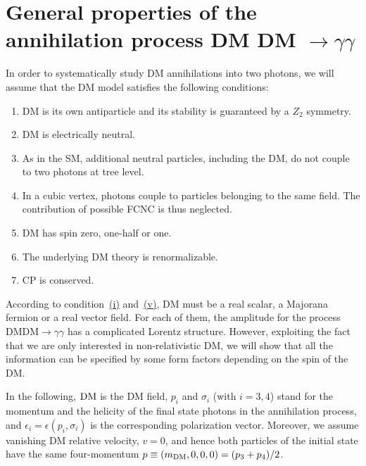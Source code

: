 \section{General properties of the annihilation process DM DM $\to \gamma \gamma$}
\label{sec:cond}
In order to systematically study DM annihilations into two photons, we will assume that the DM model satisfies the following conditions: 
%
\begin{enumerate}
\item[\label{condition:i}(i)] DM is its own antiparticle and its stability is guaranteed by a $Z_2$ symmetry. 
\item[\label{condition:ii}(ii)] DM is electrically neutral.
\item[\label{condition:iii}(iii)] As in the SM, additional neutral particles, including the DM, do not couple to two photons at tree level. 
\item[\label{condition:iv}(iv)] In a cubic vertex, photons couple to particles belonging to the same field.  The contribution of possible FCNC is thus neglected. 
\item[ \label{condition:v}(v)] DM has spin zero, one-half or one. 
\item[ \label{condition:vi}(vi)]  The underlying DM theory is renormalizable.
\item[ \label{condition:vii}(vii)]  CP is conserved. 
\end{enumerate}

According to condition~\hyperref[condition:v]{(i)} and~\hyperref[condition:v]{(v)},  DM must be a real scalar, a Majorana fermion or a real vector field. %
For each of them, the  amplitude for the process $\text{DM}\text{DM}\to\gamma\gamma$  has  a complicated Lorentz structure. However, exploiting the fact that  we are only interested in non-relativistic DM, %
we will show that all the information can be specified by some form factors depending on the spin of the DM.

In the following, $\text{DM}$ is the DM field, $p_i$ and $\sigma_i$  (with $i =3, 4$) stand for the momentum and the helicity of the final state photons in the annihilation process, and $\epsilon_i=\epsilon(p_i,\sigma_i)$ is the corresponding polarization vector. Moreover, we assume vanishing DM relative velocity, $v=0$, and hence  both particles of the initial state have the same four-momentum $p \equiv (m_{\text{DM}},0,0,0) = (p_3+p_4)/2$.










